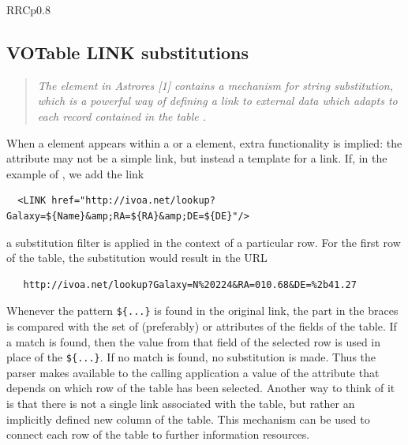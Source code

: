 \begin{tabular}{RRCp{0.8\textwidth}}
\begin{center}
{\subsection{VOTable LINK substitutions}
\label{LINK}

\begin{quote}\em {}
  The  element in Astrores [1]
  contains a mechanism for string substitution,
  which is a powerful way of defining a link to external data
  which adapts to each record contained in the table .
\end{quote}

When a {} element appears within a  or a
{} element,
extra functionality is implied: the {}
attribute may not be a simple link, but instead 
a template for a link. If, in the  example of 
, we add the link

\begin{verbatim}
  <LINK href="http://ivoa.net/lookup?Galaxy=${Name}&amp;RA=${RA}&amp;DE=${DE}"/>
\end{verbatim}

\noindent a substitution filter is applied in the context of a particular row.
For the first row of the table, the substitution would result in the URL

\begin{verbatim}
   http://ivoa.net/lookup?Galaxy=N%20224&RA=010.68&DE=%2b41.27
\end{verbatim}

Whenever the pattern {\tt{\$\{...\}}}
is found in the original link, the part in the braces is compared
with the set of {} (preferably) or 
attributes of the fields of the table. If a match is found, then the
value from that field of the selected row is used in place of the
{\tt{\$\{...\}}}. If no match is found, no substitution is made. Thus the
parser makes available to the calling application a value of the {}
attribute that depends on which row of the table has been selected.
Another way to think of it is that there is not a single link
associated with the table, but rather an implicitly defined new
column of the table. This mechanism can be used to connect each row
of the table to further information resources.



}
\end{center}
\end{tabular}
